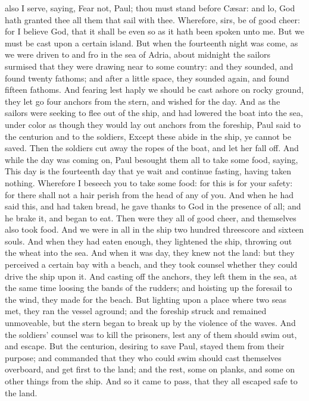 also I serve, saying, Fear not, Paul; thou must stand before Cæsar: and lo, God hath granted thee all them that sail with thee. Wherefore, sirs, be of good cheer: for I believe God, that it shall be even so as it hath been spoken unto me. But we must be cast upon a certain island.  But when the fourteenth night was come, as we were driven to and fro in the sea of Adria, about midnight the sailors surmised that they were drawing near to some country: and they sounded, and found twenty fathoms; and after a little space, they sounded again, and found fifteen fathoms. And fearing lest haply we should be cast ashore on rocky ground, they let go four anchors from the stern, and wished for the day. And as the sailors were seeking to flee out of the ship, and had lowered the boat into the sea, under color as though they would lay out anchors from the foreship, Paul said to the centurion and to the soldiers, Except these abide in the ship, ye cannot be saved. Then the soldiers cut away the ropes of the boat, and let her fall off. And while the day was coming on, Paul besought them all to take some food, saying, This day is the fourteenth day that ye wait and continue fasting, having taken nothing. Wherefore I beseech you to take some food: for this is for your safety: for there shall not a hair perish from the head of any of you. And when he had said this, and had taken bread, he gave thanks to God in the presence of all; and he brake it, and began to eat. Then were they all of good cheer, and themselves also took food. And we were in all in the ship two hundred threescore and sixteen souls. And when they had eaten enough, they lightened the ship, throwing out the wheat into the sea. And when it was day, they knew not the land: but they perceived a certain bay with a beach, and they took counsel whether they could drive the ship upon it. And casting off the anchors, they left them in the sea, at the same time loosing the bands of the rudders; and hoisting up the foresail to the wind, they made for the beach. But lighting upon a place where two seas met, they ran the vessel aground; and the foreship struck and remained unmoveable, but the stern began to break up by the violence of the waves. And the soldiers’ counsel was to kill the prisoners, lest any of them should swim out, and escape. But the centurion, desiring to save Paul, stayed them from their purpose; and commanded that they who could swim should cast themselves overboard, and get first to the land; and the rest, some on planks, and some on other things from the ship. And so it came to pass, that they all escaped safe to the land. 

